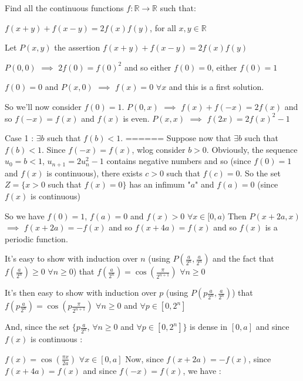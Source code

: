 \begin{solution}
	\begin{tcolorbox}Find all the continuous functions $ f: \mathbb{R} \rightarrow \mathbb{R}$ such that:

$ f(x + y) + f(x - y) = 2f(x)f(y)$, for all $ x,y \in \mathbb{R}$\end{tcolorbox}
Let $ P(x,y)$ the assertion $ f(x + y) + f(x - y) = 2f(x)f(y)$

$ P(0,0)$ $ \implies$ $ 2f(0) = f(0)^2$ and so either $ f(0) = 0$, either $ f(0) = 1$

$ f(0) = 0$ and $ P(x,0)$ $ \implies$ $ f(x) = 0$ $ \forall x$ and this is a first solution.

So we'll now consider $ f(0) = 1$.
$ P(0,x)$ $ \implies$ $ f(x) + f( - x) = 2f(x)$ and so $ f( - x) = f(x)$ and $ f(x)$ is even.
$ P(x,x)$ $ \implies$ $ f(2x) = 2f(x)^2 - 1$

Case 1 : $ \exists b$ such that $ f(b) < 1$.
======
Suppose now that $ \exists b$ such that $ f(b) < 1$. Since $ f( - x) = f(x)$, wlog consider $ b > 0$.
Obviously, the sequence $ u_0 = b < 1$, $ u_{n + 1} = 2u_n^2 - 1$ contains negative numbers and so (since $ f(0) = 1$ and $ f(x)$ is continuous), there exists $ c > 0$ such that $ f(c) = 0$. So the set $ Z = \{x > 0$ such that $ f(x) = 0\}$ has an infimum "$ a$" and $ f(a) = 0$ (since $ f(x)$ is continuous)

So we have $ f(0) = 1$, $ f(a) = 0$ and $ f(x) > 0$ $ \forall x\in[0,a)$
Then $ P(x + 2a,x)$ $ \implies$ $ f(x + 2a) = - f(x)$ and so $ f(x + 4a) = f(x)$ and so $ f(x)$ is a periodic function. 

It's easy to show with induction over $ n$ (using $ P(\frac {a}{2^n},\frac {a}{2^n})$ and the fact that $ f(\frac {a}{2^n})\geq 0$ $ \forall n\geq 0$) that $ f(\frac {a}{2^n}) = \cos(\frac {\pi}{2^{n + 1}})$ $ \forall n\geq 0$

It's then easy to show with induction over $ p$ (using $ P(p\frac {a}{2^n},\frac {a}{2^n})$) that $ f(p\frac {a}{2^n}) = \cos(p\frac {\pi}{2^{n + 1}})$ $ \forall n\geq 0$ and $ \forall p\in[0,2^n]$

And, since the set $ \{p\frac {a}{2^n}$, $ \forall n\geq 0$ and $ \forall p\in[0,2^n]\}$ is dense in $ [0,a]$ and since $ f(x)$ is continuous :

$ f(x) = \cos(\frac {\pi x}{2a})$ $ \forall x\in[0,a]$
Now, since $ f(x + 2a) = - f(x)$, since $ f(x + 4a) = f(x)$ and since $ f( - x) = f(x)$, we have :


\end{solution}
